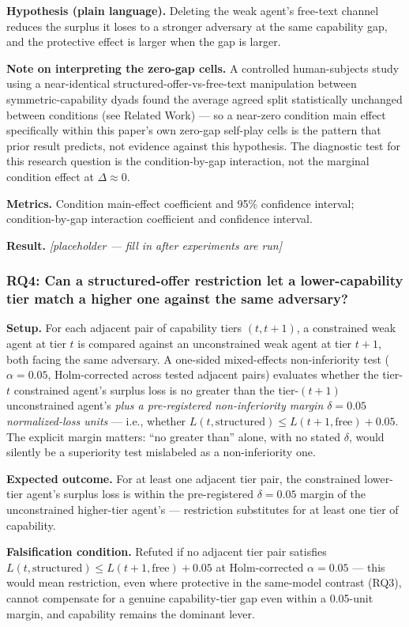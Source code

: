 \documentclass[11pt]{article}
\newcommand{\ph}{\textit{[placeholder --- fill in after experiments are run]}}
\begin{document}
\textbf{Hypothesis (plain language).} Deleting the weak agent's free-text channel reduces the surplus it loses to a stronger adversary at the same capability gap, and the protective effect is larger when the gap is larger.

\textbf{Note on interpreting the zero-gap cells.} A controlled human-subjects study using a near-identical structured-offer-vs-free-text manipulation between symmetric-capability dyads found the average agreed split statistically unchanged between conditions (see Related Work) --- so a near-zero condition main effect specifically within this paper's own zero-gap self-play cells is the pattern that prior result predicts, not evidence against this hypothesis. The diagnostic test for this research question is the condition-by-gap interaction, not the marginal condition effect at $\Delta \approx 0$.

\textbf{Metrics.} Condition main-effect coefficient and 95\% confidence interval; condition-by-gap interaction coefficient and confidence interval.

\textbf{Result.} \ph

\subsubsection{RQ4: Can a structured-offer restriction let a lower-capability tier match a higher one against the same adversary?}
\textbf{Setup.} For each adjacent pair of capability tiers $(t, t+1)$, a constrained weak agent at tier $t$ is compared against an unconstrained weak agent at tier $t+1$, both facing the same adversary. A one-sided mixed-effects non-inferiority test ($\alpha = 0.05$, Holm-corrected across tested adjacent pairs) evaluates whether the tier-$t$ constrained agent's surplus loss is no greater than the tier-$(t+1)$ unconstrained agent's \emph{plus a pre-registered non-inferiority margin $\delta = 0.05$ normalized-loss units} --- i.e., whether $L(t,\text{structured}) \leq L(t+1,\text{free}) + 0.05$. The explicit margin matters: ``no greater than'' alone, with no stated $\delta$, would silently be a superiority test mislabeled as a non-inferiority one.

\textbf{Expected outcome.} For at least one adjacent tier pair, the constrained lower-tier agent's surplus loss is within the pre-registered $\delta = 0.05$ margin of the unconstrained higher-tier agent's --- restriction substitutes for at least one tier of capability.

\textbf{Falsification condition.} Refuted if no adjacent tier pair satisfies $L(t,\text{structured}) \leq L(t+1,\text{free}) + 0.05$ at Holm-corrected $\alpha = 0.05$ --- this would mean restriction, even where protective in the same-model contrast (RQ3), cannot compensate for a genuine capability-tier gap even within a 0.05-unit margin, and capability remains the dominant lever.
\end{document}
